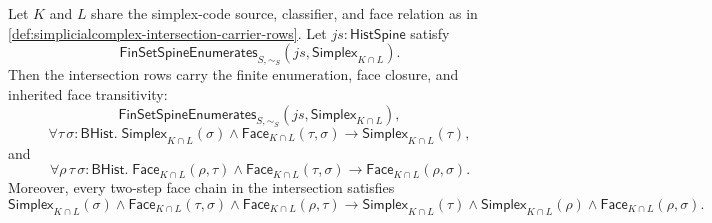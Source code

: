 \begin{theorem}
\label{thm:simplicialcomplex-intersection-carrier-face-closed}
Let $K$ and $L$ share the simplex-code source, classifier, and face relation as in \autoref{def:simplicialcomplex-intersection-carrier-rows}. Let $js:\mathsf{HistSpine}$ satisfy
$$
\mathsf{FinSetSpineEnumerates}_{S,\sim_S}(js,\mathsf{Simplex}_{K\cap L}).
$$
Then the intersection rows carry the finite enumeration, face closure, and inherited face transitivity:
$$
\mathsf{FinSetSpineEnumerates}_{S,\sim_S}(js,\mathsf{Simplex}_{K\cap L}),
$$
$$
\forall \tau\,\sigma:\mathsf{BHist}.\;
\mathsf{Simplex}_{K\cap L}(\sigma)\land
\mathsf{Face}_{K\cap L}(\tau,\sigma)
\to
\mathsf{Simplex}_{K\cap L}(\tau),
$$
and
$$
\forall \rho\,\tau\,\sigma:\mathsf{BHist}.\;
\mathsf{Face}_{K\cap L}(\rho,\tau)\land
\mathsf{Face}_{K\cap L}(\tau,\sigma)
\to
\mathsf{Face}_{K\cap L}(\rho,\sigma).
$$
Moreover, every two-step face chain in the intersection satisfies
$$
\mathsf{Simplex}_{K\cap L}(\sigma)
\land
\mathsf{Face}_{K\cap L}(\tau,\sigma)
\land
\mathsf{Face}_{K\cap L}(\rho,\tau)
\to
\mathsf{Simplex}_{K\cap L}(\tau)
\land
\mathsf{Simplex}_{K\cap L}(\rho)
\land
\mathsf{Face}_{K\cap L}(\rho,\sigma).
$$
\end{theorem}
